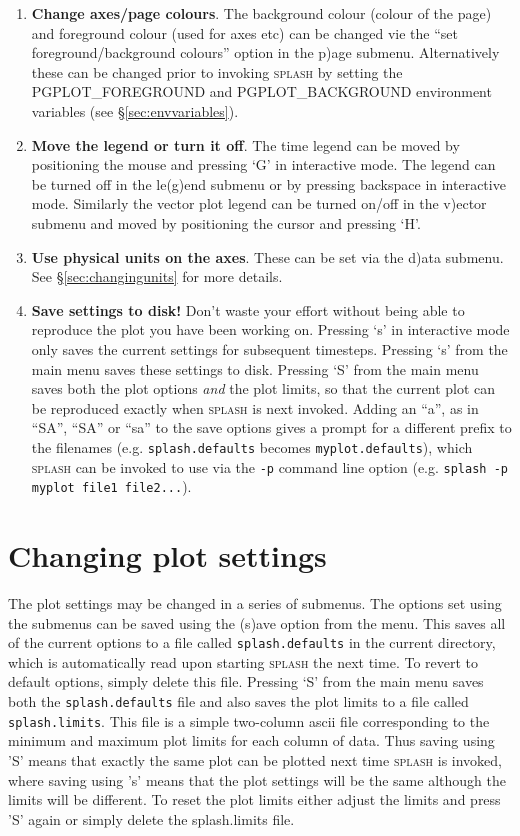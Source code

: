 \documentclass[a4paper,10pt]{article}
\newcommand{\splash}{\textsc{splash }}
\begin{document}
\begin{enumerate}
\item {\bf Change axes/page colours}. The background colour (colour of the page) and foreground colour (used for axes etc) can be changed vie the ``set foreground/background colours'' option in the p)age submenu. Alternatively these can be changed prior to invoking \splash by setting the PGPLOT\_FOREGROUND and PGPLOT\_BACKGROUND environment variables (see \S\ref{sec:envvariables}).
\item {\bf Move the legend or turn it off}. The time legend can be moved by positioning the mouse and pressing `G' in interactive mode. The legend can be turned off in the le(g)end submenu or by pressing backspace in interactive mode. Similarly the vector plot legend can be turned on/off in the v)ector submenu and moved by positioning the cursor and pressing `H'.
\item {\bf Use physical units on the axes}. These can be set via the d)ata submenu. See \S\ref{sec:changingunits} for more details.
\item {\bf Save settings to disk!} Don't waste your effort without being able to reproduce the plot you have been working on. Pressing `s' in interactive mode only saves the current settings for subsequent timesteps. Pressing `s' from the main menu saves these settings to disk. Pressing `S' from the main menu saves both the plot options \emph{and} the plot limits, so that the current plot can be reproduced exactly when \splash is next invoked. Adding an ``a'', as in ``SA'', ``SA'' or ``sa'' to the save options gives a prompt for a different prefix to the filenames (e.g. \verb+splash.defaults+ becomes \verb+myplot.defaults+), which \splash can be invoked to use via the \verb+-p+ command line option (e.g. \verb+splash -p myplot file1 file2...+).
\end{enumerate}

\section{Changing plot settings}%
 The plot settings may be changed in a series of submenus. The options set using
the submenus can be saved using the (s)ave option from the menu. This saves all of
the current options to a file called \verb+splash.defaults+ in the current directory, which is
automatically read upon starting \splash the next time. To revert to default options, simply delete this file.
Pressing `S' from the main menu saves both the \verb+splash.defaults+ file and also saves the plot limits to a file called \verb+splash.limits+. This file is a simple two-column ascii file corresponding to the minimum and maximum plot limits for each column of data. Thus saving using 'S' means that exactly the same plot can be plotted next time \splash is invoked, where saving using 's' means that the plot settings will be the same although the limits will be different. To reset the plot limits either adjust the limits and press 'S' again or simply delete the splash.limits file.
\end{document}
